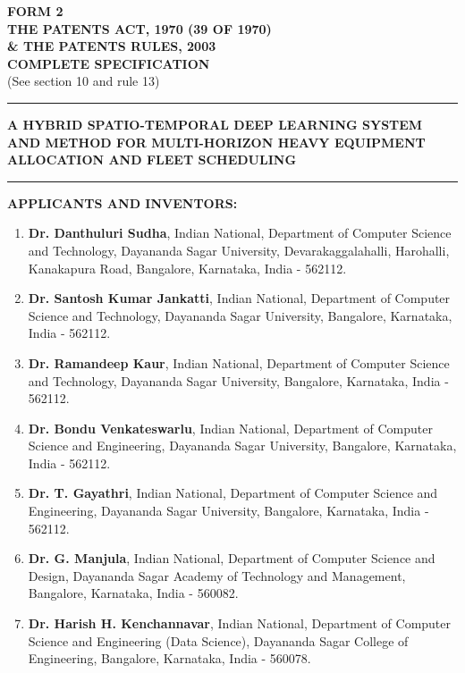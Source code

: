 \documentclass[11pt,a4paper]{article}
\begin{document}
\begin{center}
    {\large \textbf{FORM 2}}\\[0.3em]
    {\large \textbf{THE PATENTS ACT, 1970 (39 OF 1970)}}\\[0.2em]
    {\normalsize \textbf{\& THE PATENTS RULES, 2003}}\\[0.5em]
    {\large \textbf{COMPLETE SPECIFICATION}}\\[0.2em]
    {\small (See section 10 and rule 13)}
\end{center}

\vspace{1em}
\noindent\rule{\textwidth}{1.2pt}
\vspace{0.5em}

\begin{center}
    {\Large \textbf{A HYBRID SPATIO-TEMPORAL DEEP LEARNING SYSTEM AND METHOD FOR MULTI-HORIZON HEAVY EQUIPMENT ALLOCATION AND FLEET SCHEDULING}}
\end{center}

\vspace{0.5em}
\noindent\rule{\textwidth}{1.2pt}
\vspace{1em}

\textbf{APPLICANTS AND INVENTORS:}
\begin{enumerate}
    \item \textbf{Dr. Danthuluri Sudha}, Indian National, Department of Computer Science and Technology, Dayananda Sagar University, Devarakaggalahalli, Harohalli, Kanakapura Road, Bangalore, Karnataka, India - 562112.
    \item \textbf{Dr. Santosh Kumar Jankatti}, Indian National, Department of Computer Science and Technology, Dayananda Sagar University, Bangalore, Karnataka, India - 562112.
    \item \textbf{Dr. Ramandeep Kaur}, Indian National, Department of Computer Science and Technology, Dayananda Sagar University, Bangalore, Karnataka, India - 562112.
    \item \textbf{Dr. Bondu Venkateswarlu}, Indian National, Department of Computer Science and Engineering, Dayananda Sagar University, Bangalore, Karnataka, India - 562112.
    \item \textbf{Dr. T. Gayathri}, Indian National, Department of Computer Science and Engineering, Dayananda Sagar University, Bangalore, Karnataka, India - 562112.
    \item \textbf{Dr. G. Manjula}, Indian National, Department of Computer Science and Design, Dayananda Sagar Academy of Technology and Management, Bangalore, Karnataka, India - 560082.
    \item \textbf{Dr. Harish H. Kenchannavar}, Indian National, Department of Computer Science and Engineering (Data Science), Dayananda Sagar College of Engineering, Bangalore, Karnataka, India - 560078.
\end{enumerate}
\end{document}
